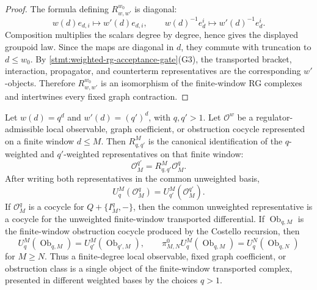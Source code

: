 \begin{proof}
  The formula defining \(R^{w_0}_{w,w'}\) is diagonal:
  \[
    w(d)e_{d,i}\mapsto w'(d)e_{d,i},\qquad
    w(d)^{-1}e^i_d\mapsto w'(d)^{-1}e^i_d .
  \]
  Composition multiplies the scalars degree by degree, hence gives the
  displayed groupoid law.  Since the maps are diagonal in \(d\), they
  commute with truncation to \(d\leq w_0\).  By
  \ref{stmt:weighted-rg-acceptance-gate}(G3), the transported bracket,
  interaction, propagator, and counterterm representatives are the
  corresponding \(w'\)-objects.  Therefore \(R^{w_0}_{w,w'}\) is an
  isomorphism of the finite-window RG complexes and intertwines every
  fixed graph contraction.
\end{proof}

\begin{thm}
\label{thm:wt-finite-degree-observables}
  Let \(w(d)=q^d\) and \(w'(d)=(q')^d\), with \(q,q'>1\).  Let
  \(\mathcal O^w\) be a regulator-admissible local observable, graph
  coefficient, or obstruction cocycle represented on a finite window
  \(d\leq M\).  Then \(R^M_{q,q'}\) is the canonical identification of
  the \(q\)-weighted and \(q'\)-weighted representatives on that
  finite window:
  \[
    \mathcal O^{q'}_M=R^M_{q,q'}\mathcal O^q_M .
  \]
  After writing both representatives in the common unweighted basis,
  \[
    U^M_q(\mathcal O^q_M)=U^M_{q'}(\mathcal O^{q'}_M).
  \]
  If \(\mathcal O^q_M\) is a cocycle for
  \(Q+\{I^q_M,-\}\), then the common unweighted representative is a
  cocycle for the unweighted finite-window transported differential.
  If \(\operatorname{Ob}_{q,M}\) is the finite-window obstruction
  cocycle produced by the Costello recursion, then
  \[
    U^M_q(\operatorname{Ob}_{q,M})
      =U^M_{q'}(\operatorname{Ob}_{q',M}),
    \qquad
    \pi^0_{M,N}U^M_q(\operatorname{Ob}_{q,M})
      =U^N_q(\operatorname{Ob}_{q,N})
  \]
  for \(M\geq N\).  Thus a finite-degree local observable, fixed graph
  coefficient, or obstruction class is a single object of the
  finite-window transported complex, presented in different weighted
  bases by the choices \(q>1\).
\end{thm}

